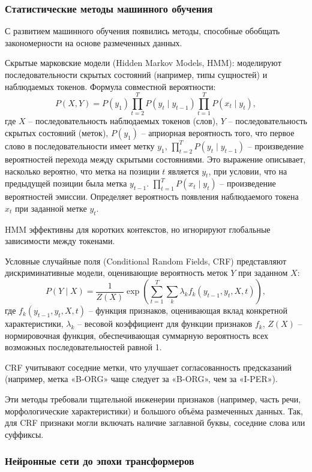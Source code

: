 \subsubsection{Статистические методы машинного обучения}

С развитием машинного обучения появились методы, способные обобщать закономерности на основе размеченных данных.

Скрытые марковские модели (Hidden Markov Models, HMM): моделируют последовательности скрытых состояний (например, типы сущностей) и наблюдаемых токенов. Формула совместной вероятности:
\[
P(X, Y) = P(y_1) \prod_{t=2}^{T} P(y_t \mid y_{t-1}) \prod_{t=1}^{T} P(x_t \mid y_t),
\]
где 
\(X\) -- последовательность наблюдаемых токенов (слов), 
\(Y\) -- последовательность скрытых состояний (меток),
\(P(y_1)\) --  априорная вероятность того, что первое слово в последовательности имеет метку \(y_1\),
\(\prod_{t=2}^{T} P(y_t \mid y_{t-1})\) --  произведение вероятностей перехода между скрытыми состояниями. Это выражение описывает, насколько вероятно, что метка на позиции \(t\) является \(y_t\), при условии, что на предыдущей позиции была метка \(y_{t-1}\).
\(\prod_{t=1}^{T} P(x_t \mid y_t)\) -- произведение вероятностей эмиссии. Определяет вероятность появления наблюдаемого токена \(x_t\) при заданной метке \(y_t\).

HMM эффективны для коротких контекстов, но игнорируют глобальные зависимости между токенами.

Условные случайные поля (Conditional Random Fields, CRF) представляют дискриминативные модели, оценивающие вероятность меток \(Y\) при заданном \(X\):
\[
P(Y \mid X) = \frac{1}{Z(X)} \exp\left(\sum_{t=1}^{T} \sum_{k} \lambda_k f_k(y_{t-1}, y_t, X, t)\right),
\]
где
\(f_k(y_{t-1}, y_t, X, t)\) -- функция признаков, оценивающая вклад конкретной характеристики,
\(\lambda_k\) -- весовой коэффициент для функции признаков \(f_k\),
\(Z(X)\) -- нормировочная функция, обеспечивающая суммарную вероятность всех возможных последовательностей равной 1. 

CRF учитывают соседние метки, что улучшает согласованность предсказаний (например, метка «B-ORG» чаще следует за «B-ORG», чем за «I-PER»).

Эти методы требовали тщательной инженерии признаков (например, часть речи, морфологические характеристики) и большого объёма размеченных данных. Так, для CRF признаки могли включать наличие заглавной буквы, соседние слова или суффиксы.

\subsubsection{Нейронные сети до эпохи трансформеров}

